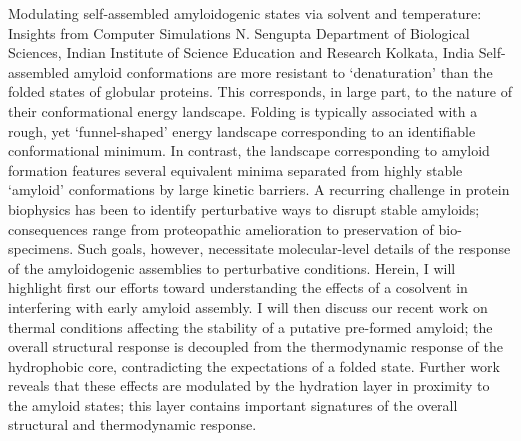 
    \begin{abstract_online}{Modulating self-assembled amyloidogenic states via solvent and temperature: Insights from Computer Simulations}{%
        N. Sengupta}{%
        \IStag}{%
        Department of Biological Sciences, Indian Institute of Science Education and Research Kolkata, India}
    Self-assembled amyloid conformations are more resistant to ‘denaturation’ than the folded states of globular proteins. This corresponds, in large part, to the nature of their conformational energy landscape. Folding is typically associated with a rough, yet ‘funnel-shaped’ energy landscape corresponding to an identifiable conformational minimum. In contrast, the landscape corresponding to amyloid formation features several equivalent minima separated from highly stable ‘amyloid’ conformations by large kinetic barriers. A recurring challenge in protein biophysics has been to identify perturbative ways to disrupt stable amyloids; consequences range from proteopathic amelioration to preservation of bio-specimens. Such goals, however, necessitate molecular-level details of the response of the amyloidogenic assemblies to perturbative conditions. Herein, I will highlight first our efforts toward understanding the effects of a cosolvent in interfering with early amyloid assembly. I will then discuss our recent work on thermal conditions affecting the stability of a putative pre-formed amyloid; the overall structural response is decoupled from the thermodynamic response of the hydrophobic core, contradicting the expectations of a folded state. Further work reveals that these effects are modulated by the hydration layer in proximity to the amyloid states; this layer contains important signatures of the overall structural and thermodynamic response. 
    
    \end{abstract_online}
    